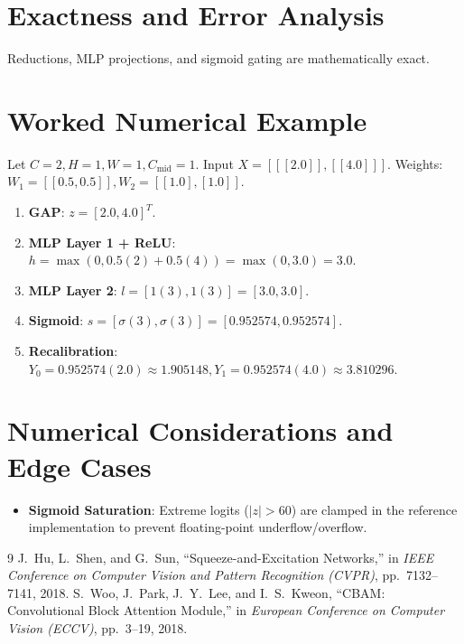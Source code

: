 \documentclass[11pt,a4paper]{article}
\theoremstyle{definition}
\begin{document}
\section{Exactness and Error Analysis}

Reductions, MLP projections, and sigmoid gating are mathematically exact.

\section{Worked Numerical Example}

Let $C = 2, H = 1, W = 1, C_{\text{mid}} = 1$.
Input $X = [[[2.0]], [[4.0]]]$.
Weights: $W_1 = [[0.5, 0.5]], W_2 = [[1.0], [1.0]]$.

\begin{enumerate}
    \item \textbf{GAP}: $z = [2.0, 4.0]^T$.
    \item \textbf{MLP Layer 1 + ReLU}: $h = \max(0, 0.5(2) + 0.5(4)) = \max(0, 3.0) = 3.0$.
    \item \textbf{MLP Layer 2}: $l = [1(3), 1(3)] = [3.0, 3.0]$.
    \item \textbf{Sigmoid}: $s = [\sigma(3), \sigma(3)] = [0.952574, 0.952574]$.
    \item \textbf{Recalibration}:
    $Y_0 = 0.952574(2.0) \approx 1.905148, Y_1 = 0.952574(4.0) \approx 3.810296$.
\end{enumerate}

\section{Numerical Considerations and Edge Cases}

\begin{itemize}
    \item \textbf{Sigmoid Saturation}: Extreme logits ($|z| > 60$) are clamped in the reference implementation to prevent floating-point underflow/overflow.
\end{itemize}

\begin{thebibliography}{9}
 J.~Hu, L.~Shen, and G.~Sun, ``Squeeze-and-Excitation Networks,'' in \emph{IEEE Conference on Computer Vision and Pattern Recognition (CVPR)}, pp.~7132--7141, 2018.
 S.~Woo, J.~Park, J.~Y.~Lee, and I.~S.~Kweon, ``CBAM: Convolutional Block Attention Module,'' in \emph{European Conference on Computer Vision (ECCV)}, pp.~3--19, 2018.
\end{thebibliography}
\end{document}
